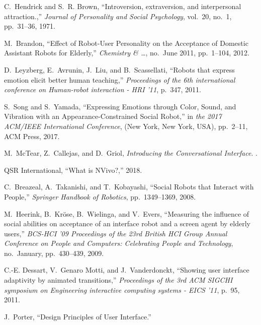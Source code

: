 \documentclass[letterpaper, 10 pt, conference]{ieeeconf}  %
\begin{document}
\begin{thebibliography}{10}
C.~Hendrick and S.~R. Brown, ``{Introversion, extraversion, and interpersonal
  attraction.},'' {\em Journal of Personality and Social Psychology}, vol.~20,
  no.~1, pp.~31--36, 1971.

M.~Brandon, ``{Effect of Robot-User Personality on the Acceptance of Domestic
  Assistant Robots for Elderly},'' {\em Chemistry {\&} {\ldots}}, no.~June
  2011, pp.~1--104, 2012.

D.~Leyzberg, E.~Avrunin, J.~Liu, and B.~Scassellati, ``{Robots that express
  emotion elicit better human teaching},'' {\em Proceedings of the 6th
  international conference on Human-robot interaction - HRI '11}, p.~347, 2011.

S.~Song and S.~Yamada, ``{Expressing Emotions through Color, Sound, and
  Vibration with an Appearance-Constrained Social Robot},'' in {\em the 2017
  ACM/IEEE International Conference}, (New York, New York, USA), pp.~2--11, ACM
  Press, 2017.

M.~McTear, Z.~Callejas, and D.~Griol, {\em {Introducing the Conversational
  Interface}}.
.

{QSR International}, ``{What is NVivo?},'' 2018.

C.~Breazeal, A.~Takanishi, and T.~Kobayashi, ``{Social Robots that Interact
  with People},'' {\em Springer Handbook of Robotics}, pp.~1349--1369, 2008.

M.~Heerink, B.~Kr{\"{o}}se, B.~Wielinga, and V.~Evers, ``{Measuring the
  influence of social abilities on acceptance of an interface robot and a
  screen agent by elderly users},'' {\em BCS-HCI '09 Proceedings of the 23rd
  British HCI Group Annual Conference on People and Computers: Celebrating
  People and Technology}, no.~January, pp.~430--439, 2009.

C.-E. Dessart, V.~{Genaro Motti}, and J.~Vanderdonckt, ``{Showing user
  interface adaptivity by animated transitions},'' {\em Proceedings of the 3rd
  ACM SIGCHI symposium on Engineering interactive computing systems - EICS
  '11}, p.~95, 2011.

J.~Porter, ``{Design Principles of User Interface}.''

\end{thebibliography}
\end{document}
